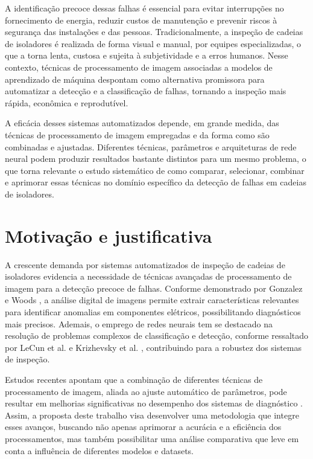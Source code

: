 A identificação precoce dessas falhas é essencial para evitar interrupções no fornecimento de energia, reduzir custos de manutenção e prevenir riscos à segurança das instalações e das pessoas. Tradicionalmente, a inspeção de cadeias de isoladores é realizada de forma visual e manual, por equipes especializadas, o que a torna lenta, custosa e sujeita à subjetividade e a erros humanos. Nesse contexto, técnicas de processamento de imagem associadas a modelos de aprendizado de máquina despontam como alternativa promissora para automatizar a detecção e a classificação de falhas, tornando a inspeção mais rápida, econômica e reprodutível.

A eficácia desses sistemas automatizados depende, em grande medida, das técnicas de processamento de imagem empregadas e da forma como são combinadas e ajustadas. Diferentes técnicas, parâmetros e arquiteturas de rede neural podem produzir resultados bastante distintos para um mesmo problema, o que torna relevante o estudo sistemático de como comparar, selecionar, combinar e aprimorar essas técnicas no domínio específico da detecção de falhas em cadeias de isoladores.

\section{Motivação e justificativa}

A crescente demanda por sistemas automatizados de inspeção de cadeias de isoladores evidencia a necessidade de técnicas avançadas de processamento de imagem para a detecção precoce de falhas. Conforme demonstrado por Gonzalez e Woods \cite{Gonzalez2008}, a análise digital de imagens permite extrair características relevantes para identificar anomalias em componentes elétricos, possibilitando diagnósticos mais precisos. Ademais, o emprego de redes neurais tem se destacado na resolução de problemas complexos de classificação e detecção, conforme ressaltado por LeCun et al. \cite{LeCun2015} e Krizhevsky et al. \cite{Krizhevsky2012}, contribuindo para a robustez dos sistemas de inspeção.

Estudos recentes apontam que a combinação de diferentes técnicas de processamento de imagem, aliada ao ajuste automático de parâmetros, pode resultar em melhorias significativas no desempenho dos sistemas de diagnóstico \cite{Salvi2021}. Assim, a proposta deste trabalho visa desenvolver uma metodologia que integre esses avanços, buscando não apenas aprimorar a acurácia e a eficiência dos processamentos, mas também possibilitar uma análise comparativa que leve em conta a influência de diferentes modelos e datasets.

